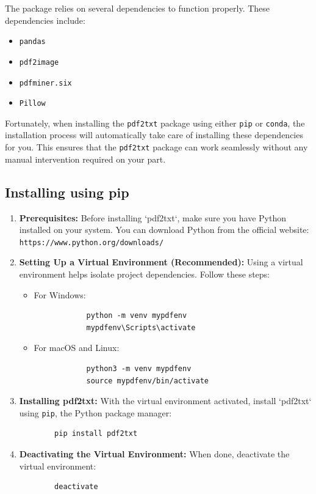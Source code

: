 The package  relies on several dependencies to function properly. These dependencies include:

\begin{itemize}
	\item \texttt{pandas}
	\item \texttt{pdf2image}
	\item \texttt{pdfminer.six}
	\item \texttt{Pillow}
\end{itemize}

Fortunately, when installing the \texttt{pdf2txt} package using either \texttt{pip} or \texttt{conda}, the installation process will automatically take care of installing these dependencies for you. This ensures that the \texttt{pdf2txt} package can work seamlessly without any manual intervention required on your part.

\subsection{Installing using pip}

\begin{enumerate}[label=Step \arabic*:, leftmargin=*]
	\item \textbf{Prerequisites:} Before installing `pdf2txt`, make sure you have Python installed on your system. You can download Python from the official website: \texttt{https://www.python.org/downloads/}
	
	\item \textbf{Setting Up a Virtual Environment (Recommended):} Using a virtual environment helps isolate project dependencies. Follow these steps:
	
	\begin{itemize}
		\item For Windows:
		\begin{verbatim}
			python -m venv mypdfenv
			mypdfenv\Scripts\activate
		\end{verbatim}
		
		\item For macOS and Linux:
		\begin{verbatim}
			python3 -m venv mypdfenv
			source mypdfenv/bin/activate
		\end{verbatim}
	\end{itemize}
	
	\item \textbf{Installing pdf2txt:} With the virtual environment activated, install `pdf2txt` using \texttt{pip}, the Python package manager:
	
	\begin{verbatim}
		pip install pdf2txt
	\end{verbatim}
	
	\item \textbf{Deactivating the Virtual Environment:} When done, deactivate the virtual environment:
	
	\begin{verbatim}
		deactivate
	\end{verbatim}
\end{enumerate}

